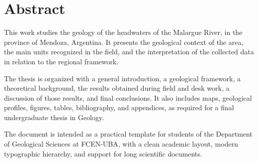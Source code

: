 \chapter*{Abstract}
This work studies the geology of the headwaters of the Malargue River, in the province of Mendoza, Argentina. It presents the geological context of the area, the main units recognized in the field, and the interpretation of the collected data in relation to the regional framework.\par
The thesis is organized with a general introduction, a geological framework, a theoretical background, the results obtained during field and desk work, a discussion of those results, and final conclusions. It also includes maps, geological profiles, figures, tables, bibliography, and appendices, as required for a final undergraduate thesis in Geology.\par
The document is intended as a practical template for students of the Department of Geological Sciences at FCEN-UBA, with a clean academic layout, modern typographic hierarchy, and support for long scientific documents.
